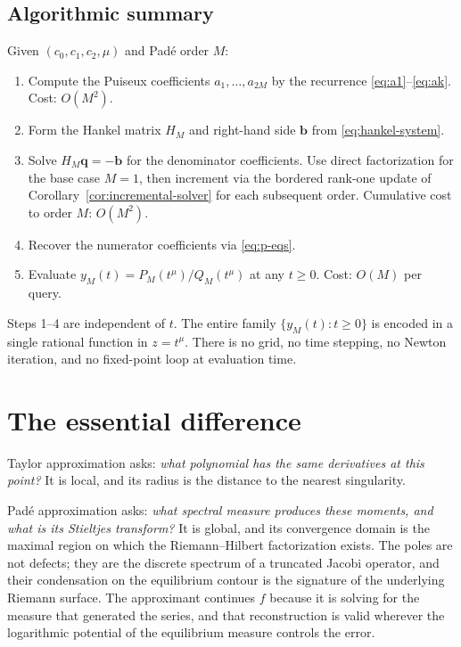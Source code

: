 \documentclass[11pt]{article}
\theoremstyle{definition}
\theoremstyle{remark}
\begin{document}
\subsection{Algorithmic summary}
\label{sec:heston-algorithm}

Given $(c_{0},c_{1},c_{2},\mu)$ and Pad\'e order $M$:
\begin{enumerate}
\item Compute the Puiseux coefficients $a_{1},\dots,a_{2M}$ by the recurrence \eqref{eq:a1}--\eqref{eq:ak}. Cost: $O(M^{2})$.
\item Form the Hankel matrix $H_{M}$ and right-hand side $\bm{b}$ from \eqref{eq:hankel-system}.
\item Solve $H_{M}\bm{q}=-\bm{b}$ for the denominator coefficients. Use direct factorization for the base case $M=1$, then increment via the bordered rank-one update of Corollary~\ref{cor:incremental-solver} for each subsequent order. Cumulative cost to order $M$: $O(M^{2})$.
\item Recover the numerator coefficients via \eqref{eq:p-eqs}.
\item Evaluate $y_{M}(t)=P_{M}(t^{\mu})/Q_{M}(t^{\mu})$ at any $t\ge 0$. Cost: $O(M)$ per query.
\end{enumerate}
Steps 1--4 are independent of $t$. The entire family $\{y_{M}(t):t\ge 0\}$ is encoded in a single rational function in $z=t^{\mu}$. There is no grid, no time stepping, no Newton iteration, and no fixed-point loop at evaluation time.

\section{The essential difference}
\label{sec:conclusion}

Taylor approximation asks: \emph{what polynomial has the same derivatives at this point?} It is local, and its radius is the distance to the nearest singularity.

Pad\'e approximation asks: \emph{what spectral measure produces these moments, and what is its Stieltjes transform?} It is global, and its convergence domain is the maximal region on which the Riemann--Hilbert factorization exists. The poles are not defects; they are the discrete spectrum of a truncated Jacobi operator, and their condensation on the equilibrium contour is the signature of the underlying Riemann surface. The approximant continues $f$ because it is solving for the measure that generated the series, and that reconstruction is valid wherever the logarithmic potential of the equilibrium measure controls the error.
\end{document}
